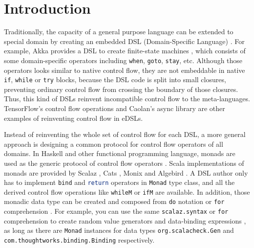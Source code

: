 \section{Introduction}\label{Introduction}

Traditionally, the capacity of a general purpose language can be extended to special domain by creating an embedded DSL (Domain-Specific Language) \cite{fowler2010domain} . For example, Akka provides a DSL to create finite-state machines \cite{lightbend2017akka}, which consists of some domain-specific operators including \lstinline{when}, \lstinline{goto}, \lstinline{stay}, etc. Although those operators looks similar to native control flow, they are not embeddable in native \lstinline{if}, \lstinline{while} or \lstinline{try} blocks, because the DSL code is split into small closures, preventing ordinary control flow from crossing the boundary of those closures. Thus, this kind of DSLs reinvent incompatible control flow to the meta-languages. TensorFlow's control flow operations \cite{abadi2016tensorflow} and Caolan's async library \cite{caolan2017async} are other examples of reinventing control flow in eDSLs.

Instead of reinventing the whole set of control flow for each DSL, a more general approach is designing a common protocol for control flow operators of all domains. In Haskell and other functional programming language, monads are used as the generic protocol of control flow operators \cite{wadler1990comprehending,wadler1992essence,jones1993composing}. Scala implementations of monads are provided by Scalaz \cite{kenji2017scalaz}, Cats \cite{typelevel2017cats}, Monix \cite{nedelcu2017monix} and Algebird \cite{twitter2016algebird}. A DSL author only has to implement \lstinline{bind} and \lstinline[language=Haskell,deletekeywords={return}]{return} operators in \lstinline{Monad} type class, and all the derived control flow operations like \lstinline{whileM} or \lstinline{ifM} are available. In addition, those monadic data type can be created and composed from \lstinline{do} notation \cite{jones1998haskell} or \lstinline{for} comprehension \cite{odersky2004scala}. For example, you can use the same \lstinline{scalaz.syntax} or \lstinline{for} comprehension to create random value generators \cite{nilsson2015scalacheck} and data-binding expressions \cite{yangbo2016binding}, as long as there are \lstinline{Monad} instances for data types \lstinline{org.scalacheck.Gen} and \lstinline{com.thoughtworks.binding.Binding} respectively.

